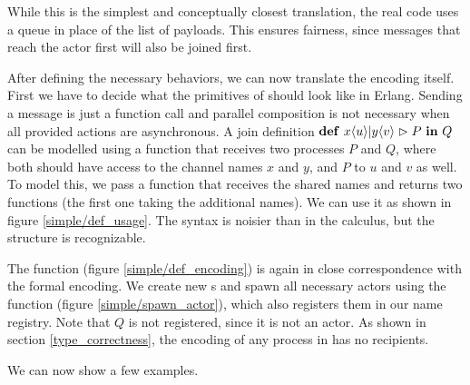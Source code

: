 
While this is the simplest and conceptually closest translation,
the real code uses a queue in place of the list of payloads.
This ensures fairness, since messages that reach the actor first
will also be joined first.


After defining the necessary behaviors,
we can now translate the encoding itself.
First we have to decide what the primitives of \joincalc should look like
in Erlang.
Sending a message is just a function call and parallel composition
is not necessary when all provided actions are asynchronous.
A join definition
$\textbf{\textup{def}} \ x\langle u\rangle | y\langle v\rangle \vartriangleright P \ \textbf{\textup{in}} \ Q$
can be modelled using a function that receives two processes $P$ and $Q$,
where both should have access to the channel names $x$ and $y$,
and $P$ to $u$ and $v$ as well.
To model this, we pass a function that receives the shared names and
returns two functions (the first one taking the additional names).
We can use it as shown in figure \ref{simple/def_usage}.
The syntax is noisier than in the calculus, but the structure is recognizable.


The  function (figure \ref{simple/def_encoding})
is again in close correspondence with the formal encoding.
We create new \actorname{}s and spawn all necessary actors
using the  function (figure \ref{simple/spawn_actor}),
which also registers them in our name registry.
Note that $Q$ is not registered, since it is not an actor.
As shown in section \ref{type_correctness},
the encoding of any process in \joincalc has no recipients.



We can now show a few examples.

